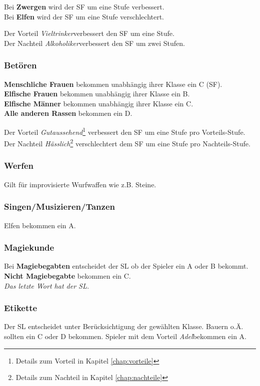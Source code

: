 Bei \textbf{Zwergen} wird der SF um eine Stufe verbessert. \\
Bei \textbf{Elfen} wird der SF um eine Stufe verschlechtert. 

Der Vorteil \textit{Vieltrinker}\footnotemark[4] verbessert den SF um eine Stufe. \\
Der Nachteil \textit{Alkoholiker}\footnotemark[5] verbessert den SF um zwei Stufen. 

\subsubsection{Betören}
\textbf{Menschliche Frauen} bekommen unabhängig ihrer Klasse ein C (SF). \\
\textbf{Elfische Frauen} bekommen unabhängig ihrer Klasse ein B. \\
\textbf{Elfische Männer} bekommen unabhängig ihrer Klasse ein C. \\
\textbf{Alle anderen Rassen} bekommen ein D. 

Der Vorteil \textit{Gutaussehend}\footnote{Details zum Vorteil in Kapitel \ref{chap:vorteile}} verbessert den SF um eine Stufe pro Vorteils-Stufe. \\
Der Nachteil \textit{Hässlich}\footnote{Details zum Nachteil in Kapitel \ref{chap:nachteile}} verschlechtert dem SF um eine Stufe pro Nachteils-Stufe. 

\subsubsection{Werfen}
Gilt für improvisierte Wurfwaffen wie z.B. Steine.

\subsubsection{Singen/Musizieren/Tanzen}
Elfen bekommen ein A.

\subsubsection{Magiekunde}
Bei \textbf{Magiebegabten} entscheidet der SL ob der Spieler ein A oder B bekommt. \\
\textbf{Nicht Magiebegabte} bekommen ein C. \\
\textit{Das letzte Wort hat der SL.}

\subsubsection{Etikette}
Der SL entscheidet unter Berücksichtigung der gewählten Klasse. Bauern o.Ä. sollten ein C oder D bekommen. Spieler mit dem Vorteil \textit{Adel}\footnotemark[4] bekommen ein A.

